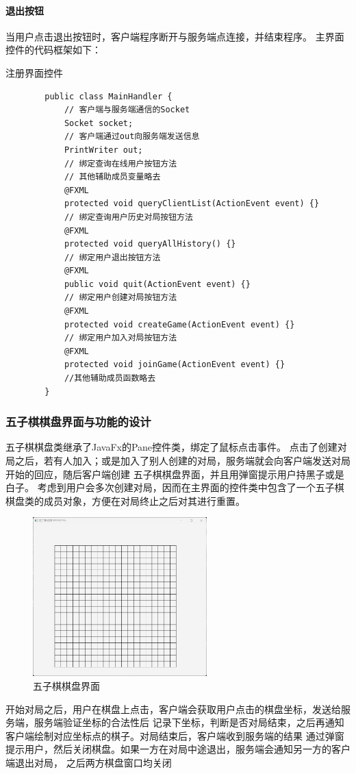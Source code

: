 \documentclass[utf8]{article}
\begin{document}
\paragraph{退出按钮}
当用户点击退出按钮时，客户端程序断开与服务端点连接，并结束程序。
\newpage
主界面控件的代码框架如下：
\begin{listing}[H]
    \caption{注册界面控件}
    \begin{verbatim}
        public class MainHandler {
            // 客户端与服务端通信的Socket
            Socket socket;
            // 客户端通过out向服务端发送信息
            PrintWriter out;
            // 绑定查询在线用户按钮方法
            // 其他辅助成员变量略去
            @FXML
            protected void queryClientList(ActionEvent event) {}
            // 绑定查询用户历史对局按钮方法
            @FXML
            protected void queryAllHistory() {}
            // 绑定用户退出按钮方法
            @FXML
            public void quit(ActionEvent event) {}
            // 绑定用户创建对局按钮方法
            @FXML
            protected void createGame(ActionEvent event) {}
            // 绑定用户加入对局按钮方法
            @FXML
            protected void joinGame(ActionEvent event) {}
            //其他辅助成员函数略去
        }
    \end{verbatim}
\end{listing}
\subsubsection{五子棋棋盘界面与功能的设计}
五子棋棋盘类继承了JavaFx的Pane控件类，绑定了鼠标点击事件。
点击了创建对局之后，若有人加入；或是加入了别人创建的对局，服务端就会向客户端发送对局开始的回应，随后客户端创建
五子棋棋盘界面，并且用弹窗提示用户持黑子或是白子。
考虑到用户会多次创建对局，因而在主界面的控件类中包含了一个五子棋棋盘类的成员对象，方便在对局终止之后对其进行重置。
\begin{figure}[H]
    \centering
    \includegraphics[width=0.6\textwidth]{pictures/11}
    \caption{五子棋棋盘界面}
\end{figure}
开始对局之后，用户在棋盘上点击，客户端会获取用户点击的棋盘坐标，发送给服务端，服务端验证坐标的合法性后
记录下坐标，判断是否对局结束，之后再通知客户端绘制对应坐标点的棋子。对局结束后，客户端收到服务端的结果
通过弹窗提示用户，然后关闭棋盘。如果一方在对局中途退出，服务端会通知另一方的客户端退出对局，
之后两方棋盘窗口均关闭
\end{document}
